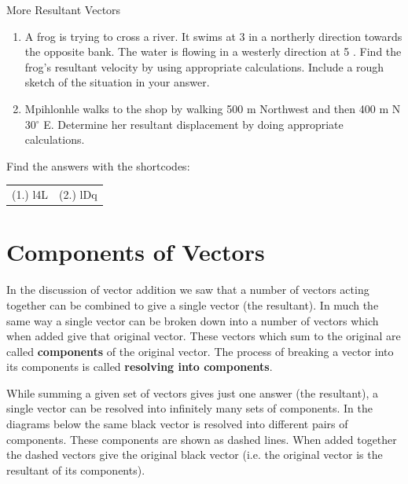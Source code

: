 \begin{exercises}{More Resultant Vectors} \noindent
\begin{enumerate}[noitemsep, label=\textbf{\arabic*}.] 
\item A frog is trying to cross a river. It swims at 3 \ms in a northerly direction towards the opposite bank. The water is flowing in a westerly direction at 5 \ms. Find the frog's resultant velocity by using appropriate calculations. Include a rough sketch of the situation in your answer.
\item Mpihlonhle walks to the shop by walking 500 m Northwest and then 400 m N 30$^\circ$ E. Determine her resultant displacement by doing appropriate calculations.
\end{enumerate}

  \label{59e414b70efc194a27a122db47d06ce6**end}
\par {} Find the answers with the shortcodes:
 \par \begin{tabular}[h]{cc}
 (1.) l4L  &  (2.) lDq   & \end{tabular}
\end{exercises}
\section{Components of Vectors}
In the discussion of vector addition we saw that a number of vectors acting
together can be combined to give a single vector (the resultant). In
much the same way a single vector can be broken down into a number of vectors which when added give that original vector. These vectors which sum to the original are called {\bf components} of the original vector. The process of breaking a vector into its components is called {\bf resolving into components}.

While summing a given set of vectors gives just one answer (the
resultant), a single vector can be resolved into infinitely many sets
of components. In the diagrams below the same black vector is resolved
into different pairs of components. These components are shown as dashed lines. When added together the dashed vectors give the original black vector
(i.e. the original vector is the resultant of its components).

